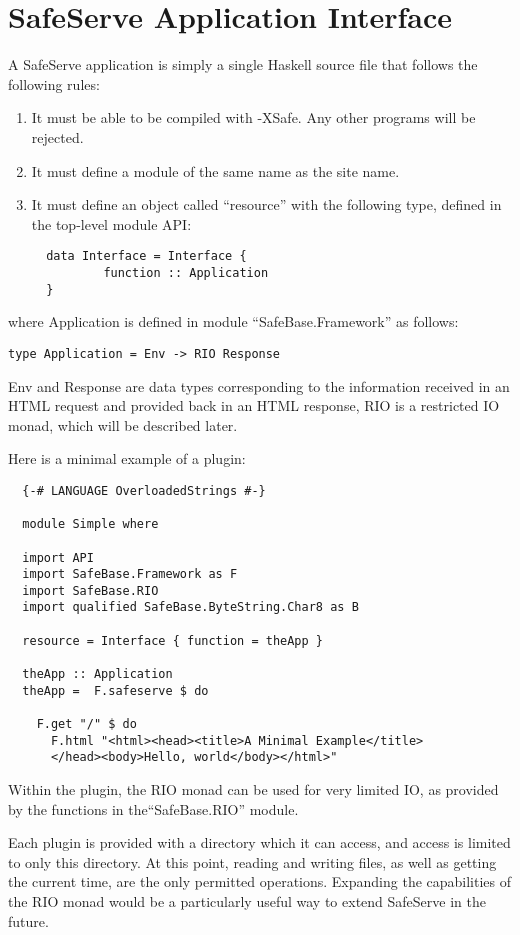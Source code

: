 \documentclass[12pt]{article}
\begin{document}
\section{SafeServe Application Interface}
A SafeServe application is simply a single Haskell source file that follows
the following rules:
\begin{enumerate}
\item It must be able to be compiled with -XSafe.  Any other programs will be rejected.

\item It must define a module of the same name as the site name.

\item It must define an object called ``resource'' with the following type, defined in the
top-level module API:
\begin{verbatim}
  data Interface = Interface { 
          function :: Application
  }
\end{verbatim}
\end{enumerate}
where Application is defined in module ``SafeBase.Framework'' as follows:
\begin{verbatim}
type Application = Env -> RIO Response
\end{verbatim}
Env and Response are data types corresponding to the information received in an HTML
request and provided back in an HTML response, RIO is a restricted IO monad, which
will be described later.

Here is a minimal example of a plugin:

\begin{verbatim}
  {-# LANGUAGE OverloadedStrings #-}

  module Simple where

  import API
  import SafeBase.Framework as F
  import SafeBase.RIO
  import qualified SafeBase.ByteString.Char8 as B

  resource = Interface { function = theApp }

  theApp :: Application
  theApp =  F.safeserve $ do

    F.get "/" $ do
      F.html "<html><head><title>A Minimal Example</title>
      </head><body>Hello, world</body></html>"  
\end{verbatim}

Within the plugin, the RIO monad can be used for very limited IO, as
provided by the functions in the``SafeBase.RIO'' module.

Each plugin is provided with a directory which it can access,
and access is limited to only this directory.  At this point, reading and
writing files, as well as getting the current time, are the only permitted
operations.  Expanding the capabilities of the RIO monad would be a
particularly useful way to extend SafeServe in the future.
\end{document}
